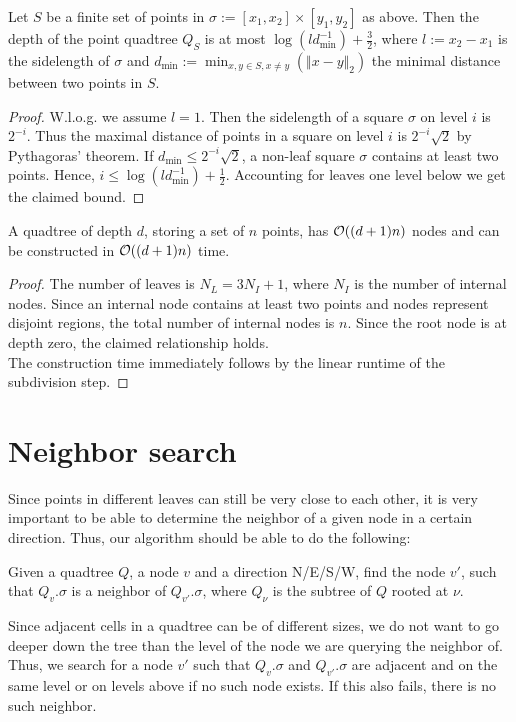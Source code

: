     \begin{lemma}
        Let $S$ be a finite set of points in $\sigma := [x_1, x_2] \times [y_1, y_2]$ as above. Then the depth of the point quadtree $Q_S$ is at most $\log(ld_{\min}^{-1}) + \frac{3}{2}$, where $l := x_2 - x_1$ is the sidelength of $\sigma$ and $d_{\min} := \min_{x, y \in S, x \neq y}(\Vert x - y \Vert_2)$ the minimal distance between two points in $S$. 
    \end{lemma}
    \begin{proof} 
        W.l.o.g. we assume $l = 1$. Then the sidelength of a square $\sigma$ on level $i$ is $2^{-i}$. Thus the maximal distance of points in a square on level $i$ is $2^{-i}\sqrt{2}$ by Pythagoras' theorem. If $d_{\min} \leq 2^{-i}\sqrt{2}$, a non-leaf square $\sigma$ contains at least two points. Hence, $i \leq \log(ld_{\min}^{-1}) + \frac{1}{2}$. Accounting for leaves one level below we get the claimed bound.
    \end{proof}

    \begin{theorem}
        A quadtree of depth $d$, storing a set of $n$ points, has $\mathcal{O}((d+1)n)$ nodes and can be constructed in $\mathcal{O}((d+1)n)$ time. 
    \end{theorem}
    \begin{proof} 
        The number of leaves is $N_L = 3N_I + 1$, where $N_I$ is the number of internal nodes. Since an internal node contains at least two points and nodes represent disjoint regions, the total number of internal nodes is $n$. Since the root node is  at depth zero, the claimed relationship holds. \\
        The construction time immediately follows by the linear runtime of the subdivision step. 
    \end{proof}

\section{Neighbor search}
    Since points in different leaves can still be very close to each other, it is very important to be able to determine the neighbor of a given node in a certain direction. Thus, our algorithm should be able to do the following:
    \begin{mdframed}
        Given a quadtree $Q$, a node $v$ and a direction N/E/S/W, find the node $v'$, such that $Q_v.\sigma$ is a neighbor of $Q_{v'}.\sigma$, where $Q_\nu$ is the subtree of $Q$ rooted at $\nu$. 
    \end{mdframed}
    Since adjacent cells in a quadtree can be of different sizes, we do not want to go deeper down the tree than the level of the node we are querying the neighbor of. Thus, we search for a node $v'$ such that $Q_v.\sigma$ and $Q_{v'}.\sigma$ are adjacent and on the same level or on levels above if no such node exists. If this also fails, there is no such neighbor.

